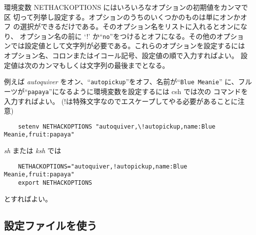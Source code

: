 環境変数 NETHACKOPTIONS にはいろいろなオプションの初期値をカンマで区
切って列挙し設定する。オプションのうちのいくつかのものは単にオンかオフ
の選択ができるだけである。そのオプション名をリストに入れるとオンになり、
オプション名の前に `!' か``{\tt no}''をつけるとオフになる。その他のオプショ
ンでは設定値として文字列が必要である。これらのオプションを設定するには
オプション名、コロンまたはイコール記号、設定値の順で入力すればよい。
設定値は次のカンマもしくは文字列の最後までとなる。

例えば {\it autoquiver} をオン、``{\tt autopickup}''をオフ、名前が``{\tt Blue Meanie}'' 
に、フルーツが``{\tt papaya}''になるように環境変数を設定するには {\bb csh} では次の
コマンドを入力すればよい。
(!は特殊文字なのでエスケープしてやる必要があることに注意)
\begin{verbatim}
    setenv NETHACKOPTIONS "autoquiver,\!autopickup,name:Blue Meanie,fruit:papaya"
\end{verbatim}
{\it sh} または {\it ksh} では
\begin{verbatim}
    NETHACKOPTIONS="autoquiver,!autopickup,name:Blue Meanie,fruit:papaya"
    export NETHACKOPTIONS
\end{verbatim}
とすればよい。

\subsection*{設定ファイルを使う}

